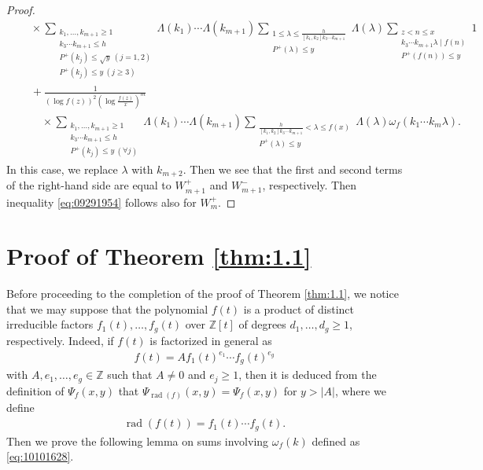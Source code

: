 \documentclass[a4paper,11pt]{amsart}
\theoremstyle{definition}
\numberwithin{equation}{section}
\DeclareMathOperator{\rad}{rad}
\begin{document}
\begin{proof}
\begin{align*}
&\quad \times
\sum_{\substack{k_1,\ldots,k_{m+1} \geq 1 \\ [k_1,k_2]k_3 \cdots k_{m+1} \leq h \\ P^+(k_j) \leq \sqrt{y} ~(j=1,2) \\ P^+(k_j) \leq y ~(j \geq 3)}} 
\Lambda(k_1) \cdots \Lambda(k_{m+1}) 
\sum_{\substack{1 \leq \lambda \leq \frac{h}{[k_1,k_2] k_3 \cdots k_{m+1}} \\ P^+(\lambda) \leq y}} \Lambda(\lambda)
\sum_{\substack{z<n \leq x \\ [k_1,k_2] k_3 \cdots k_{m+1} \lambda \mid f(n) \\ P^+(f(n)) \leq y}}  1 \\
&\quad
+ \frac{1}{(\log{f(z)})^2 \left(\log{\frac{f(z)}{x}}\right)^m} \\
&\qquad \times
\sum_{\substack{k_1,\ldots,k_{m+1} \geq 1 \\ [k_1,k_2]k_3 \cdots k_{m+1} \leq h \\ P^+(k_j) \leq y ~(\forall j)}} 
\Lambda(k_1) \cdots \Lambda(k_{m+1}) 
\sum_{\substack{\frac{h}{[k_1,k_2] k_3 \cdots k_{m+1}} < \lambda \leq f(x) \\ P^+(\lambda) \leq y}} \Lambda(\lambda)
\omega_f(k_1 \cdots k_m \lambda). 
\end{align*}
In this case, we replace $\lambda$ with $k_{m+2}$. 
Then we see that the first and second terms of the right-hand side are equal to $W_{m+1}^+$ and $W_{m+1}^-$, respectively. 
Then inequality \eqref{eq:09291954} follows also for $W_m^+$.
\end{proof}


\section{Proof of Theorem \ref{thm:1.1}}\label{sec:4}
Before proceeding to the completion of the proof of Theorem \ref{thm:1.1}, we notice that we may suppose that the polynomial $f(t)$ is a product of distinct irreducible factors $f_1(t), \ldots, f_g(t)$ over $\mathbb{Z}[t]$ of degrees $d_1, \ldots, d_g \geq1$, respectively. 
Indeed, if $f(t)$ is factorized in general as 
\begin{align*}
f(t)
= A f_1(t)^{e_1} \cdots f_g(t)^{e_g}
\end{align*}
with $A, e_1,\ldots,e_g \in \mathbb{Z}$ such that $A \neq0$ and $e_j \geq1$, then it is deduced from the definition of $\Psi_f(x,y)$ that $\Psi_{\rad(f)}(x,y) = \Psi_{f}(x,y)$ for $y>|A|$, where we define
\begin{align*}
\rad(f(t))
= f_1(t) \cdots f_g(t). 
\end{align*}
Then we prove the following lemma on sums involving $\omega_f(k)$ defined as \eqref{eq:10101628}. 
\end{document}
